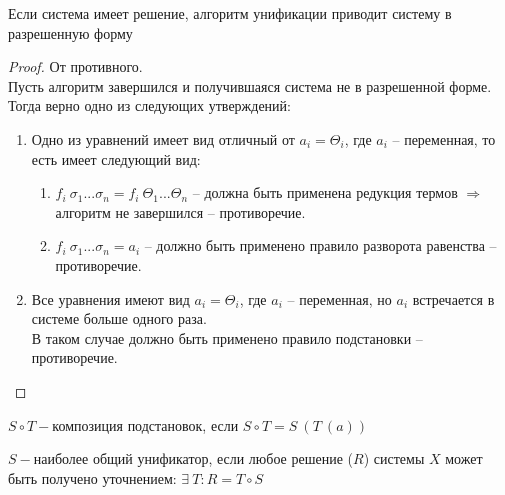 	\begin{statement} Если система имеет решение, алгоритм унификации приводит систему в разрешенную форму \end{statement}
	\begin{proof}
		От противного. \\ 
		Пусть алгоритм завершился и получившаяся система не в разрешенной форме.\\
		Тогда верно одно из следующих утверждений:
		\begin{enumerate}
			\item Одно из уравнений имеет вид отличный от $a_i = \Theta_i$, где $a_i$ -- переменная, то есть имеет следующий вид:
			\begin{enumerate}
				\item $f_i ~ \sigma_1 ... \sigma_n = f_i ~ \Theta_1 ... \Theta_n$ -- должна быть применена редукция термов $\Rightarrow$ алгоритм не завершился -- противоречие.
				\item $f_i ~ \sigma_1 ... \sigma_n = a_i$ -- должно быть применено правило разворота равенства -- противоречие.
			\end{enumerate}
			\item Все уравнения имеют вид $a_i = \Theta_i$, где $a_i$ -- переменная, но $a_i$ встречается в системе больше одного раза. \\
			В таком случае должно быть применено правило подстановки -- противоречие.
		\end{enumerate}
	\end{proof}
	\begin{definition} $S \circ T-$композиция подстановок, если $S \circ T=S\:(T\:(a))$\end{definition}
	\begin{definition} $S-$наиболее общий унификатор, если любое решение ($R$) системы $X$ может быть получено уточнением: $\exists\:T:R=T\circ S$\end{definition}
	
